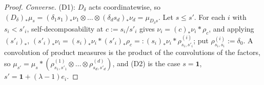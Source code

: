 \begin{proof}
\emph{Converse.} (D1): $D_\delta$ acts coordinatewise, so
$(D_\delta)_*\mu_s = (\delta_1s_1)_*\nu_1 \otimes \dots \otimes (\delta_ds_d)_*\nu_d = \mu_{D_\delta s}$. Let $s \le s'$. For
each $i$ with $s_i < s'_i$, self-decomposability at $c := s_i/s'_i$ gives
$\nu_i = (c)_*\nu_i * \rho_c$, and applying $(s'_i)_*$,
$(s'_i)_*\nu_i = (s_i)_*\nu_i * (s'_i)_*\rho_c =: (s_i)_*\nu_i * \rho^{(i)}_{s_i,s'_i}$; put
$\rho^{(i)}_{s_i,s_i} := \delta_0$. A convolution of product measures is the product of the
convolutions of the factors, so $\mu_{s'} = \mu_s * (\rho^{(1)}_{s_1,s'_1} \otimes \dots \otimes \rho^{(d)}_{s_d,s'_d})$, and (D2)
is the case $s = \mathbf 1$, $s' = \mathbf 1 + (\lambda - 1)e_i$.
\end{proof}

